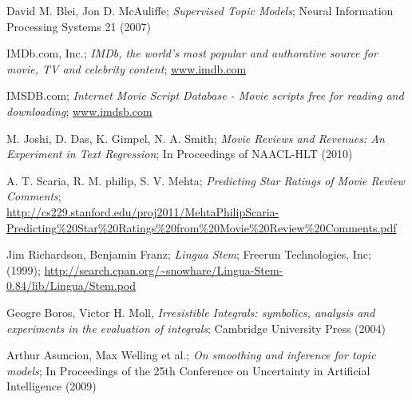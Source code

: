 \documentclass{article} %
\begin{document}
\vspace*{-3\baselineskip}
\renewcommand{\refname}{\subsubsection*{References}} %
\begin{thebibliography}{9}
  David M. Blei, Jon D. McAuliffe;
  \emph{Supervised Topic Models};
  Neural Information Processing Systems 21 (2007)
  
  IMDb.com, Inc.; 
  \emph{IMDb, the world's most popular and authorative source for movie, TV and celebrity content};
  \url{www.imdb.com}
  
  IMSDB.com; 
  \emph{Internet Movie Script Database - Movie scripts free for reading and downloading};
  \url{www.imdsb.com}

  M. Joshi, D. Das, K. Gimpel, N. A. Smith;
  \emph{Movie Reviews and Revenues: An Experiment in Text Regression};
  In Proceedings of NAACL-HLT (2010)

  A. T. Scaria, R. M. philip, S. V. Mehta;
  \emph{Predicting Star Ratings of Movie Review Comments};\\
  \url{http://cs229.stanford.edu/proj2011/MehtaPhilipScaria-Predicting\%20Star\%20Ratings\%20from\%20Movie\%20Review\%20Comments.pdf}
  
  Jim Richardson, Benjamin Franz;
  \emph{Lingua Stem};
  Freerun Technologies, Inc; (1999);
  \url{http://search.cpan.org/~snowhare/Lingua-Stem-0.84/lib/Lingua/Stem.pod}

  Geogre Boros, Victor H. Moll,
  \emph{Irresistible Integrals: symbolics, analysis and experiments in the evaluation of integrals};
  Cambridge University Press (2004)
  
  Arthur Asuncion, Max Welling et al.; 
  \emph{On smoothing and inference for topic models};
  In Proceedings of the 25th Conference on Uncertainty in Artificial Intelligence (2009)

\end{thebibliography}
\end{document}
